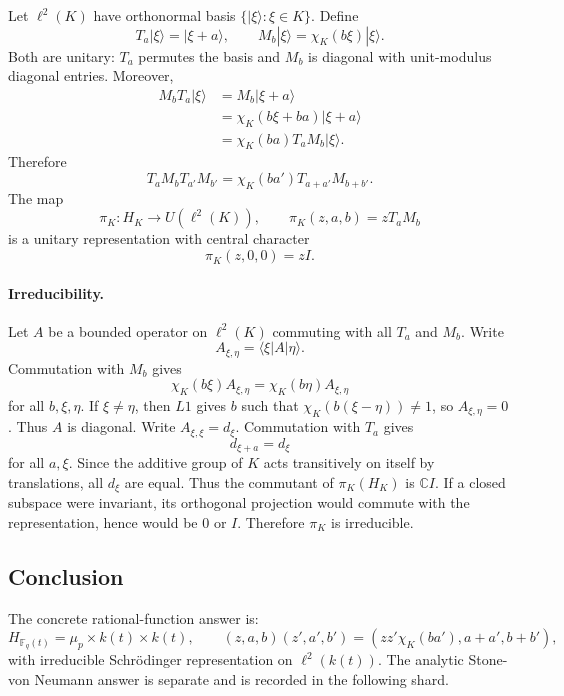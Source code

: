 Let \(\ell^2(K)\) have orthonormal basis \(\{|\xi\rangle:\xi\in K\}\).  Define
\[
  T_a|\xi\rangle=|\xi+a\rangle,
  \qquad
  M_b|\xi\rangle=\chi_K(b\xi)|\xi\rangle.
\]
Both are unitary: \(T_a\) permutes the basis and \(M_b\) is diagonal with
unit-modulus diagonal entries.  Moreover,
\[
\begin{aligned}
  M_bT_a|\xi\rangle
  &=M_b|\xi+a\rangle                                      \\
  &=\chi_K(b\xi+ba)|\xi+a\rangle                          \\
  &=\chi_K(ba)T_aM_b|\xi\rangle.
\end{aligned}
\]
Therefore
\[
  T_aM_bT_{a'}M_{b'}=\chi_K(ba')T_{a+a'}M_{b+b'}.
\]
The map
\[
  \pi_K:H_K\longrightarrow U(\ell^2(K)),\qquad
  \pi_K(z,a,b)=zT_aM_b
\]
is a unitary representation with central character
\[
  \pi_K(z,0,0)=zI.
\]

\paragraph{Irreducibility.}
Let \(A\) be a bounded operator on \(\ell^2(K)\) commuting with all
\(T_a\) and \(M_b\).  Write
\[
  A_{\xi,\eta}=\langle \xi|A|\eta\rangle.
\]
Commutation with \(M_b\) gives
\[
  \chi_K(b\xi)A_{\xi,\eta}=\chi_K(b\eta)A_{\xi,\eta}
\]
for all \(b,\xi,\eta\).  If \(\xi\ne\eta\), then \(L1\) gives \(b\) such that
\(\chi_K(b(\xi-\eta))\ne1\), so \(A_{\xi,\eta}=0\).  Thus \(A\) is diagonal.
Write \(A_{\xi,\xi}=d_\xi\).  Commutation with \(T_a\) gives
\[
  d_{\xi+a}=d_\xi
\]
for all \(a,\xi\).  Since the additive group of \(K\) acts transitively on
itself by translations, all \(d_\xi\) are equal.  Thus the commutant of
\(\pi_K(H_K)\) is \(\mathbb C I\).  If a closed subspace were invariant, its
orthogonal projection would commute with the representation, hence would be
\(0\) or \(I\).  Therefore \(\pi_K\) is irreducible.

\subsection{Conclusion}

The concrete rational-function answer is:
\[
  H_{\mathbb F_q(t)}=\mu_p\times k(t)\times k(t),
  \qquad
  (z,a,b)(z',a',b')=(zz'\chi_K(ba'),a+a',b+b'),
\]
with irreducible Schrödinger representation on \(\ell^2(k(t))\).  The analytic
Stone-von Neumann answer is separate and is recorded in the following shard.

